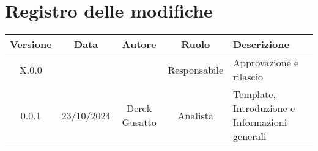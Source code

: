 
\section*{Registro delle modifiche}
\begin{table}[H]
    \begin{tabular}{|c|c|c|c|p{3cm}|}
        \hline
         \textbf{Versione} &  \textbf{Data} &  \textbf{Autore} &  \textbf{Ruolo} & \textbf{Descrizione} \\
          \hline
          X.0.0 &  &  & Responsabile & Approvazione e rilascio\\
          \hline
          0.0.1 & 23/10/2024 & Derek Gusatto & Analista & Template, Introduzione e Informazioni generali \\
          
          \hline
    \end{tabular}
\end{table}